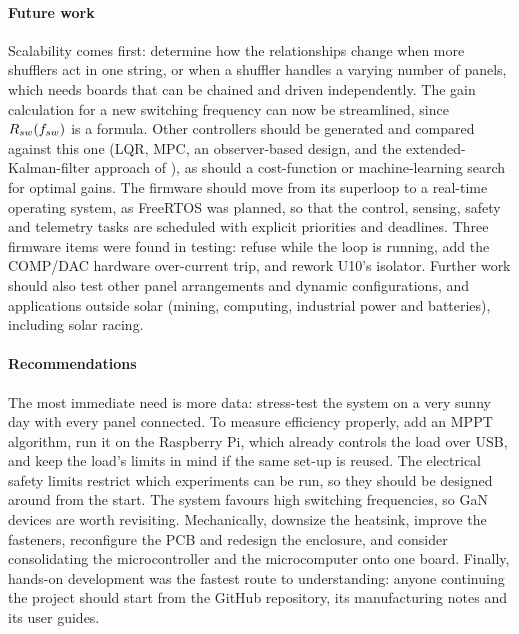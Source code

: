 \paragraph{Future work}
Scalability comes first: determine how the relationships change when more shufflers act in one string, or when a shuffler handles a varying number of panels, which needs boards that can be chained and driven independently. The gain calculation for a new switching frequency can now be streamlined, since $R_{sw}(f_{sw})$ is a formula. Other controllers should be generated and compared against this one (LQR, MPC, an observer-based design, and the extended-Kalman-filter approach of \cite{kabalci_highly_2022}), as should a cost-function or machine-learning search for optimal gains. The firmware should move from its superloop to a real-time operating system, as FreeRTOS was planned, so that the control, sensing, safety and telemetry tasks are scheduled with explicit priorities and deadlines. Three firmware items were found in testing: refuse  while the loop is running, add the COMP/DAC hardware over-current trip, and rework U10's isolator. Further work should also test other panel arrangements and dynamic configurations, and applications outside solar (mining, computing, industrial power and batteries), including solar racing.

\paragraph{Recommendations}
The most immediate need is more data: stress-test the system on a very sunny day with every panel connected. To measure efficiency properly, add an MPPT algorithm, run it on the Raspberry Pi, which already controls the load over USB, and keep the load's limits in mind if the same set-up is reused. The electrical safety limits restrict which experiments can be run, so they should be designed around from the start. The system favours high switching frequencies, so GaN devices are worth revisiting. Mechanically, downsize the heatsink, improve the fasteners, reconfigure the PCB and redesign the enclosure, and consider consolidating the microcontroller and the microcomputer onto one board. Finally, hands-on development was the fastest route to understanding: anyone continuing the project should start from the GitHub repository, its manufacturing notes and its user guides.
